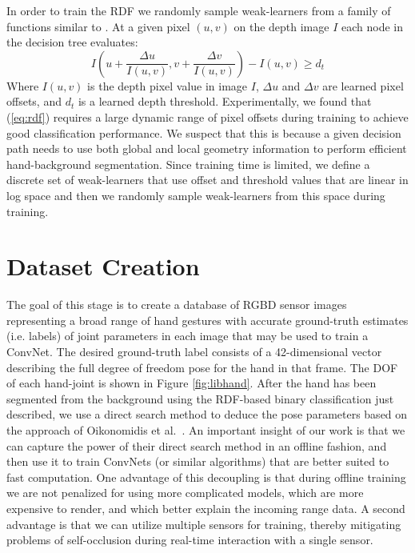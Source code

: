 In order to train the RDF we randomly sample weak-learners from a family of functions similar to \cite{shotton2013real}. At a given pixel $(u,v)$ on the depth image $I$ each node in the decision tree evaluates:
\begin{equation}
    I\left(u + \frac{\Delta u}{I\left(u,v\right)}, v + \frac{\Delta v}{I\left(u,v\right)}\right) - I\left(u,v\right)\geq d_{t}
    \label{eq:rdf}
\end{equation}
Where $I\left(u,v\right)$ is the depth pixel value in image $I$, $\Delta u$ and $\Delta v$ are learned pixel offsets, and $d_{t}$ is a learned depth threshold. Experimentally, we found that (\ref{eq:rdf}) requires a large dynamic range of pixel offsets during training to achieve good classification performance. We suspect that this is because a given decision path needs to use both global and local geometry information to perform efficient hand-background segmentation. Since training time is limited, we define a discrete set of weak-learners that use offset and threshold values that are linear in log space and then we randomly sample weak-learners from this space during training.

\section{Dataset Creation}
\label{sec:datasetcreation}

The goal of this stage is to create a database of RGBD sensor images representing a broad range of hand gestures with accurate ground-truth estimates (i.e. labels) of joint parameters in each image that may be used to train a ConvNet. The desired ground-truth label consists of a 42-dimensional vector describing the full degree of freedom pose for the hand in that frame. The DOF of each hand-joint is shown in Figure \ref{fig:libhand}. After the hand has been segmented from the background using the RDF-based binary classification just described, we use a direct search method to deduce the pose parameters based on the approach of Oikonomidis et al.~\cite{bmvc2011oikonom}. An important insight of our work is that we can capture the power of their direct search method in an offline fashion, and then use it to train ConvNets (or similar  algorithms) that are better suited to fast computation. One advantage of this decoupling is that during offline training we are not penalized for using more complicated models, which are more expensive to render, and which better explain the incoming range data. A second advantage is that we can utilize multiple sensors for training, thereby mitigating problems of self-occlusion during real-time interaction with a single sensor.

